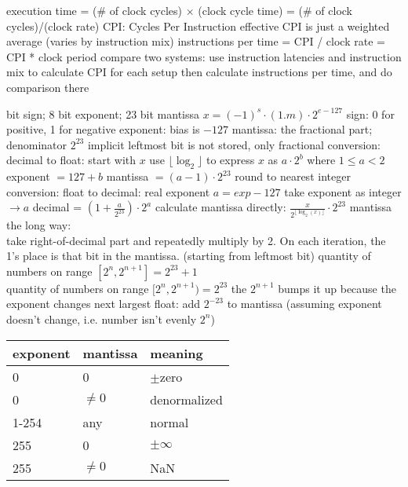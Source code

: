 \documentclass[12pt]{article}
\begin{document}
\begin{spacing}{0.8}
\begin{multicols*}{2}
\begin{flushleft}
\begin{outline}[longenum]
  \1 execution time = (\# of clock cycles) $\times$ (clock cycle time)
    = (\# of clock cycles)/(clock rate) 
  \1 CPI: Cycles Per Instruction
    \2 effective CPI is just a weighted average (varies by instruction mix)
  \1 instructions per time = CPI / clock rate = CPI * clock period
  \1 compare two systems:
    \2 use instruction latencies and instruction mix to calculate CPI for each setup
    \2 then calculate instructions per time, and do comparison there 

   bit sign; 8 bit exponent; 23 bit mantissa
    \2 $x = (-1)^s \cdot (1.m) \cdot 2^{e-127}$
  \1 sign: 0 for positive, 1 for negative
  \1 exponent: bias is $-127$
  \1 mantissa: the fractional part; denominator $2^{23}$
    \2 implicit leftmost bit is not stored, only fractional
  \1 conversion: decimal to float:
    \2 start with $x$
    \2 use $\lfloor \log_2 \rfloor$ to express $x$ as $a \cdot 2^b$ where $1\leq a < 2$
    \2 exponent $=127+b$
    \2 mantissa $=(a-1) \cdot 2^{23}$
      \3 round to nearest integer
  \1 conversion: float to decimal:
    \2 real exponent $a = exp-127$
    \2 take exponent as integer $\rightarrow a$
    \2 decimal = $(1 + \frac{a}{2^{23}}) \cdot 2^a$
  \1 calculate mantissa directly: $\frac{x}{2^{\lfloor \log_2(x) \rfloor}} \cdot 2^{23}$
  \1 mantissa the long way:
    \\ take right-of-decimal part and repeatedly multiply by 2. On each iteration, the 1's place is that bit in the mantissa. (starting from leftmost bit)
  \1 quantity of numbers on range $[2^n, 2^{n+1}] = 2^{23} + 1$
    \\ quantity of numbers on range $[2^n, 2^{n+1}) = 2^{23}$
    \2 the $2^{n+1}$ bumps it up because the exponent changes
  \1 next largest float: add $2^{-23}$ to mantissa (assuming exponent doesn't change, i.e. number isn't evenly $2^n$)
  \1 
  \begin{tabular}{|l l l|} \hline
    exponent & mantissa & meaning     \\ \hline
    0        & 0        & $\pm$zero        \\ \hline
    0        & $\not=0$ & denormalized \\ \hline
    1-254    & any      & normal      \\ \hline
    255      & 0        & $\pm\infty$ \\ \hline
    255      & $\not=0$ & NaN         \\ \hline
  \end{tabular}
  \1 
  \begin{tabular}{|l r r|} \hline

\end{tabular}
\end{outline}
\end{flushleft}
\end{multicols*}
\end{spacing}
\end{document}
